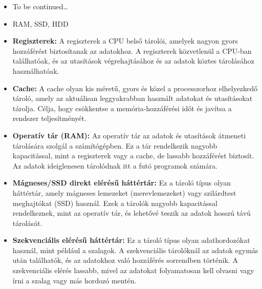 \documentclass[11pt,a4paper]{article}
\begin{document}
            \begin{tcolorbox}[colback=blue!5!white,colframe=blue!50!black,title= 11. Ismertesse a D tároló felépítését és működését!]
                \begin{itemize}
                    \item To be continued…
                \end{itemize}
            \end{tcolorbox}

            \begin{tcolorbox}[colback=blue!5!white,colframe=blue!50!black,title= 12. Melyik tároló tartalmaz a számítógépben D tárolót?]
                \begin{itemize}
                    \item RAM, SSD, HDD
                \end{itemize}
            \end{tcolorbox}
            
            \begin{tcolorbox}[colback=blue!5!white,colframe=blue!50!black,title= 13. Ismertesse a tárolók hierarchia szintjeit!]
                \begin{itemize}
                    \item \textbf{Regiszterek:} A regiszterek a CPU belső tárolói, amelyek nagyon gyors hozzáférést biztosítanak az adatokhoz. A regiszterek közvetlenül a CPU-ban találhatóak, és az utasítások végrehajtásához és az adatok köztes tárolásához használhatóak.
                    \item \textbf{Cache:} A cache olyan kis méretű, gyors és közel a processzorhoz elhelyezkedő tároló, amely az aktuálisan leggyakrabban használt adatokat és utasításokat tárolja. Célja, hogy csökkentse a memória-hozzáférési időt és javítsa a rendszer teljesítményét.
                    \item \textbf{Operatív tár (RAM):} Az operatív tár az adatok és utasítások átmeneti tárolására szolgál a számítógépben. Ez a tár rendelkezik nagyobb kapacitással, mint a regiszterek vagy a cache, de lassabb hozzáférést biztosít. Az adatok ideiglenesen tárolódnak itt a futó programok számára.
                    \item \textbf{Mágneses/SSD direkt elérésű háttértár:} Ez a tároló típus olyan háttértár, amely mágneses lemezeket (merevlemezeket) vagy szilárdtest meghajtókat (SSD) használ. Ezek a tárolók nagyobb kapacitással rendelkeznek, mint az operatív tár, és lehetővé teszik az adatok hosszú távú tárolását.
                    \item \textbf{Szekvenciális elérésű háttértár:} Ez a tároló típus olyan adathordozókat használ, mint például a szalagok. A szekvenciális tárolóknál az adatok egymás után találhatók, és az adatokhoz való hozzáférés sorrendben történik. A szekvenciális elérés lassabb, mivel az adatokat folyamatosan kell olvasni vagy írni a szalag vagy más hordozó mentén.
                \end{itemize}
            \end{tcolorbox}
            
\end{document}
